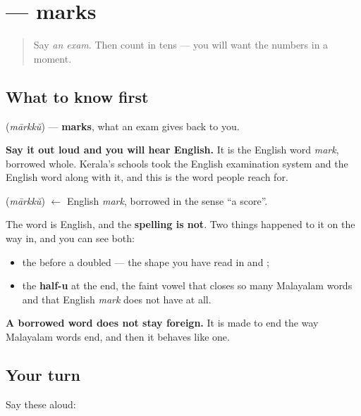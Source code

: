 \section[\texorpdfstring{\ml{മാർക്ക്} (mārkkŭ)}{മാർക്ക് (mārkkŭ)}]{ — marks}

\label{lesson:ML-C103-maarkku}



\begin{quote}
Say \emph{an exam}. Then count in tens — you will want the numbers in a moment.
\end{quote}

\subsection*{What to know first}
\textbf{} (\emph{mārkkŭ}) — \textbf{marks}, what an exam gives back to you.

\textbf{Say it out loud and you will hear English.} It is the English word \emph{mark}, borrowed whole. Kerala's schools took the English examination system and the English word along with it, and this is the word people reach for.

\begin{cousinweb}
\textbf{} (\emph{mārkkŭ}) $\leftarrow$ English \emph{mark}, borrowed in the sense \textquotedblleft{}a score\textquotedblright{}.
\end{cousinweb}

\begin{grammarlens}[title={Grammar Lens: what the borrowing had to change}]
The word is English, and the \textbf{spelling is not}. Two things happened to it on the way in, and you can see both:

\begin{itemize}
\raggedright
  \item the \textbf{} before a doubled \textbf{} — the shape you have read in \textbf{} and \textbf{};
  \item the \textbf{half-u} at the end, the faint vowel that closes so many Malayalam words and that English \emph{mark} does not have at all.
\end{itemize}

\textbf{A borrowed word does not stay foreign.} It is made to end the way Malayalam words end, and then it behaves like one.
\end{grammarlens}

\subsection*{Your turn}
Say these aloud:

